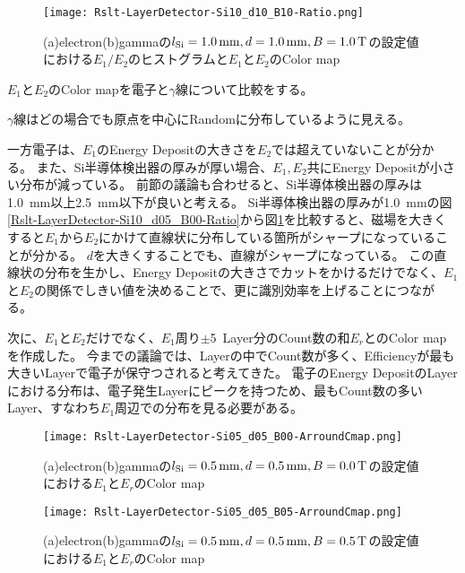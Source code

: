 \documentclass[a4paper,10pt]{jreport}
\begin{document}
\begin{figure}[H]
	\center
	\texttt{[image: Rslt-LayerDetector-Si10\_d10\_B10-Ratio.png]}
	\caption{(a)electron(b)gammaの$l_{\rm{Si}}=\SI{1.0}{mm}, d=\SI{1.0}{mm}, B=\SI{1.0}{T}$の設定値における$E_1/E_2$のヒストグラムと$E_1$と$E_2$のColor map}
	\label{Rslt-LayerDetector-Si05_d05_B00-Ratio}
\end{figure}

$E_1$と$E_2$のColor mapを電子と$\gamma$線について比較をする。

$\gamma$線はどの場合でも原点を中心にRandomに分布しているように見える。

一方電子は、$E_1$のEnergy Depositの大きさを$E_2$では超えていないことが分かる。
また、Si半導体検出器の厚みが厚い場合、$E_1,E_2$共にEnergy Depositが小さい分布が減っている。
前節の議論も合わせると、Si半導体検出器の厚みは\SI{1.0}{mm}以上\SI{2.5}{mm}以下が良いと考える。
Si半導体検出器の厚みが\SI{1.0}{mm}の図\ref{Rslt-LayerDetector-Si10_d05_B00-Ratio}から図\ref{Rslt-LayerDetector-Si05_d05_B00-Ratio}を比較すると、磁場を大きくすると$E_1$から$E_2$にかけて直線状に分布している箇所がシャープになっていることが分かる。
$d$を大きくすることでも、直線がシャープになっている。
この直線状の分布を生かし、Energy Depositの大きさでカットをかけるだけでなく、$E_1$と$E_2$の関係でしきい値を決めることで、更に識別効率を上げることにつながる。


次に、$E_1$と$E_2$だけでなく、$E_1$周り$\pm$\SI{5}{Layer}分のCount数の和$E_r$とのColor mapを作成した。
今までの議論では、Layerの中でCount数が多く、Efficiencyが最も大きいLayerで電子が保守つされると考えてきた。
電子のEnergy DepositのLayerにおける分布は、電子発生Layerにピークを持つため、最もCount数の多いLayer、すなわち$E_1$周辺での分布を見る必要がある。

\begin{figure}[H]
	\center
	\texttt{[image: Rslt-LayerDetector-Si05\_d05\_B00-ArroundCmap.png]}
	\caption{(a)electron(b)gammaの$l_{\rm{Si}}=\SI{0.5}{mm}, d=\SI{0.5}{mm}, B=\SI{0.0}{T}$の設定値における$E_1$と$E_r$のColor map}
	\label{Rslt-LayerDetector-Si05_d05_B00-ArroundCmap}
\end{figure}

\begin{figure}[H]
	\center
	\texttt{[image: Rslt-LayerDetector-Si05\_d05\_B05-ArroundCmap.png]}
	\caption{(a)electron(b)gammaの$l_{\rm{Si}}=\SI{0.5}{mm}, d=\SI{0.5}{mm}, B=\SI{0.5}{T}$の設定値における$E_1$と$E_r$のColor map}
	\label{Rslt-LayerDetector-Si05_d05_B05-ArroundCmap}
\end{figure}
\end{document}
